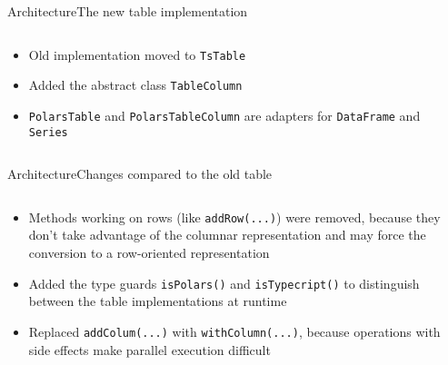 \begin{frame}[t]{Architecture}{The new table implementation}
	\begin{columns}[T]
		\begin{column}{0.5\linewidth}
			\begin{itemize}
				\item Old implementation moved to \Verb|TsTable|
				\item Added the abstract class \Verb|TableColumn|
				\item \Verb|PolarsTable| and \Verb|PolarsTableColumn| are adapters\footnotemark \text{ } for \Verb|DataFrame| and \Verb|Series|
			\end{itemize}
		\end{column}
		\hfill
		\begin{column}{0.5\linewidth}
			
		\end{column}
	\end{columns}
\end{frame}
\begin{frame}[t]{Architecture}{Changes compared to the old table}
	\begin{columns}[T]
		\begin{column}{0.6\linewidth}
			\begin{itemize}
				\item Methods working on rows (like \Verb|addRow(...)|) were removed, because they don't take advantage of the columnar representation and may force the conversion to a row-oriented representation
				\item Added the type guards \Verb|isPolars()| and \Verb|isTypecript()| to distinguish between the table implementations at runtime
				\item Replaced \Verb|addColum(...)| with \Verb|withColumn(...)|, because operations with side effects make parallel execution difficult\footnotemark
			\end{itemize}
		\end{column}
		\begin{column}{0.4\linewidth}
			\vfill
			\small
			
			\vfill
		\end{column}
	\end{columns}
\end{frame}
